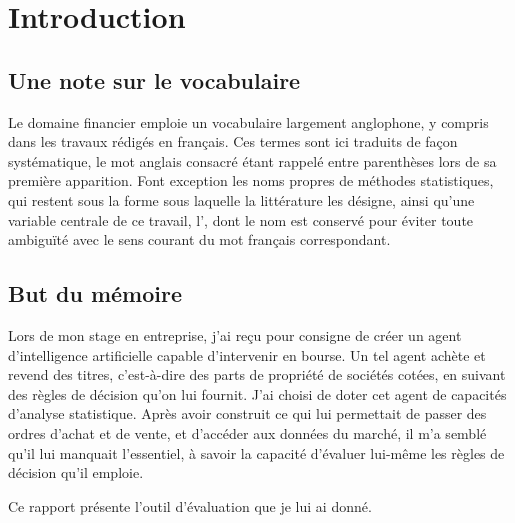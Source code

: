 \chapter*{Introduction}
\label{chap:intro}

\section*{Une note sur le vocabulaire}
\label{sec:vocabulaire}

Le domaine financier emploie un vocabulaire largement anglophone, y compris
dans les travaux rédigés en français. Ces termes sont ici traduits de façon
systématique, le mot anglais consacré étant rappelé entre parenthèses lors de
sa première apparition. Font exception les noms propres de méthodes
statistiques, qui restent sous la forme sous laquelle la littérature les
désigne, ainsi qu'une variable centrale de ce travail, l'\edgevar{}, dont le
nom est conservé pour éviter toute ambiguïté avec le sens courant du mot
français correspondant.

\section*{But du mémoire}
\label{sec:but}


Lors de mon stage en entreprise, j'ai reçu pour consigne de créer un agent
d'intelligence artificielle capable d'intervenir en bourse. Un tel agent
achète et revend des titres, c'est-à-dire des parts de propriété de sociétés
cotées, en suivant des règles de décision qu'on lui fournit. J'ai choisi de
doter cet agent de capacités d'analyse statistique. Après avoir construit ce
qui lui permettait de passer des ordres d'achat et de vente, et d'accéder aux
données du marché, il m'a semblé qu'il lui manquait l'essentiel, à savoir la
capacité d'évaluer lui-même les règles de décision qu'il emploie.

Ce rapport présente l'outil d'évaluation que je lui ai donné.

